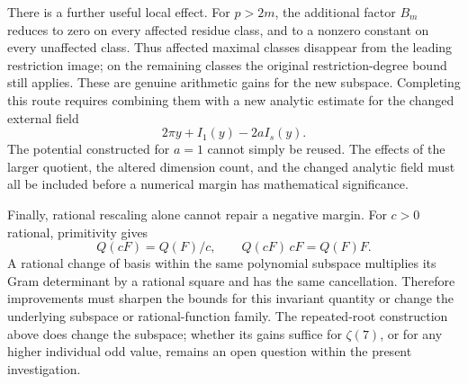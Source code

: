 \documentclass[11pt,letterpaper]{article}
\theoremstyle{definition}
\begin{document}
There is a further useful local effect. For $p>2m$, the additional
factor $B_m$ reduces to zero on every affected residue class, and
to a nonzero constant on every unaffected class. Thus affected
maximal classes disappear from the leading restriction image;
on the remaining classes the original restriction-degree bound
still applies. These are genuine arithmetic gains for the new
subspace. Completing this route requires combining them with a
new analytic estimate for the changed external field
\[
 2\pi y+I_1(y)-2aI_s(y).
\]
The potential constructed for $a=1$ cannot simply be reused.
The effects of the larger quotient, the altered dimension count,
and the changed analytic field must all be included before a
numerical margin has mathematical significance.

Finally, rational rescaling alone cannot repair a negative margin.
For $c>0$ rational, primitivity gives
\[
 Q(cF)=Q(F)/c,\qquad Q(cF)\,cF=Q(F)F.
\]
A rational change of basis within the same polynomial subspace
multiplies its Gram determinant by a rational square and has the
same cancellation. Therefore improvements must sharpen the bounds
for this invariant quantity or change the underlying subspace or
rational-function family. The repeated-root construction above
does change the subspace; whether its gains suffice for $\zeta(7)$,
or for any higher individual odd value, remains an open question
within the present investigation.


\appendix
\end{document}
